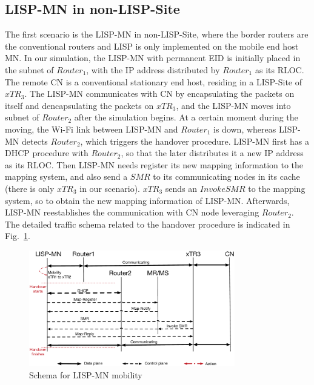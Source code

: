 


\subsection{LISP-MN in non-LISP-Site}
\label{sec:ns3_analysis_lispmn}
The first scenario is the LISP-MN in non-LISP-Site, where the border routers are the conventional routers and LISP is only implemented on the mobile end host MN. In our simulation, the LISP-MN with permanent EID is initially placed in the subnet of $Router_1$, with the IP address distributed by $Router_1$ as its RLOC. The remote CN is a conventional stationary end host, residing in a LISP-Site of $xTR_3$. The LISP-MN communicates with CN by encapsulating the packets on itself and dencapsulating the packets on $xTR_3$, and the LISP-MN moves into subnet of $Router_2$ after the simulation begins. At a certain moment during the moving, the Wi-Fi link between LISP-MN and $Router_1$ is down, whereas LISP-MN detects $Router_2$, which triggers the handover procedure. LISP-MN first has a DHCP procedure with $Router_2$, so that the later distributes it a new IP address as its RLOC. Then LISP-MN needs register its new mapping information to the mapping system, and also send a $SMR$ to its communicating nodes in its cache (there is only $xTR_3$ in our scenario). $xTR_3$ sends an $Invoke SMR$ to the mapping system, so to obtain the new mapping information of LISP-MN. Afterwards, LISP-MN reestablishes the communication with CN node leveraging $Router_2$. The detailed traffic schema related to the handover procedure is indicated in Fig.~\ref{sim_schema_LISPMN}.  %
\begin{figure}[!th]
	\centering
	\includegraphics[width=0.8\textwidth]{Pics/Mobility_LISPMN_schema_SMR_simplify}
	\caption{Schema for LISP-MN mobility}
	\label{sim_schema_LISPMN}
\end{figure}

